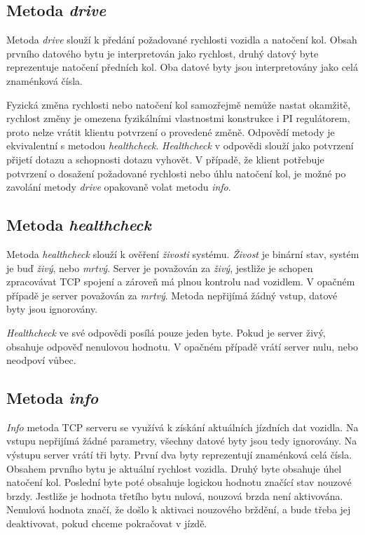 \documentclass[czech, bachelor]{diploma}
\begin{document}
\subsection{Metoda \emph{drive}}
Metoda \emph{drive} slouží k předání požadované rychlosti vozidla a natočení kol. Obsah prvního datového bytu je interpretován
jako rychlost, druhý datový byte reprezentuje natočení předních kol. Oba datové byty jsou interpretovány jako celá znaménková
čísla.

Fyzická změna rychlosti nebo natočení kol samozřejmě nemůže nastat okamžitě, rychlost změny je omezena fyzikálními vlastnostmi
konstrukce i PI regulátorem, proto nelze vrátit klientu potvrzení o provedené změně. Odpovědí metody je ekvivalentní s metodou
\emph{healthcheck}. \emph{Healthcheck} v odpovědi slouží jako potvrzení přijetí dotazu a schopnosti dotazu vyhovět. V případě,
že klient potřebuje potvrzení o dosažení požadované rychlosti nebo úhlu natočení kol, je možné po zavolání metody \emph{drive}
opakovaně volat metodu \emph{info}.

\subsection{Metoda \emph{healthcheck}}
Metoda \emph{healthcheck} slouží k ověření \emph{živosti} systému. \emph{Živost} je binární stav, systém je buď \emph{živý}, nebo
\emph{mrtvý}. Server je považován za \emph{živý}, jestliže je schopen zpracovávat TCP spojení a zároveň má plnou kontrolu
nad vozidlem. V opačném případě je server považován za \emph{mrtvý}. Metoda nepřijímá žádný vstup, datové byty jsou ignorovány.

\emph{Healthcheck} ve své odpovědi posílá pouze jeden byte. Pokud je server živý, obsahuje odpověď nenulovou hodnotu. V opačném
případě vrátí server nulu, nebo neodpoví vůbec.

\subsection{Metoda \emph{info}}
\emph{Info} metoda TCP serveru se využívá k získání aktuálních jízdních dat vozidla. Na vstupu nepřijímá žádné parametry, všechny
datové byty jsou tedy ignorovány. Na výstupu server vrátí tři byty. První dva byty reprezentují znaménková celá čísla. Obsahem
prvního bytu je aktuální rychlost vozidla. Druhý byte obsahuje úhel natočení kol. Poslední byte poté obsahuje logickou hodnotu
značící stav nouzové brzdy. Jestliže je hodnota třetího bytu nulová, nouzová brzda není aktivována. Nenulová hodnota značí,
že došlo k aktivaci nouzového brždění, a bude třeba jej deaktivovat, pokud chceme pokračovat v jízdě.
\end{document}
